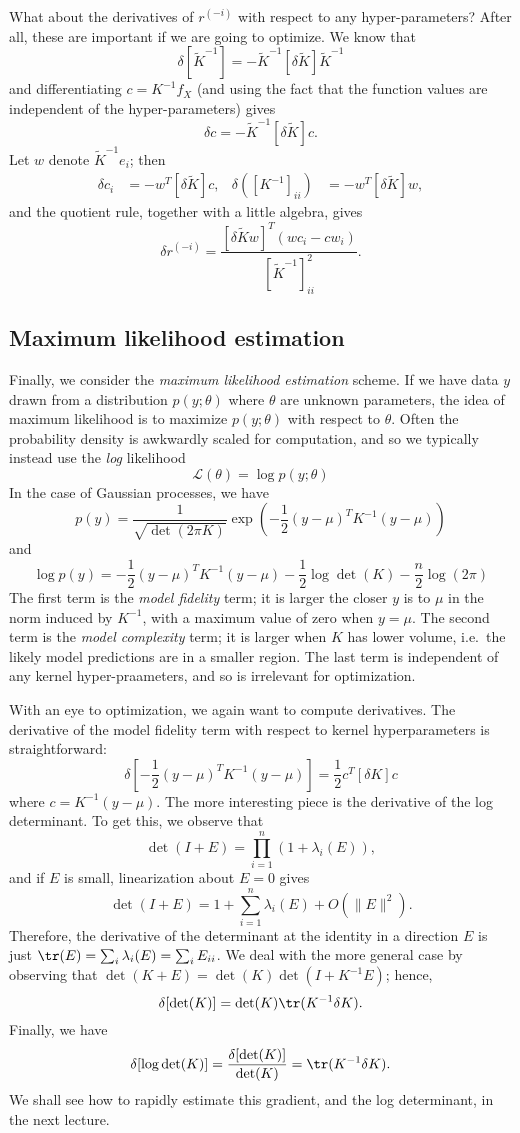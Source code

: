 \documentclass[12pt, leqno]{article} %
\begin{document}
What about the derivatives of $r^{(-i)}$ with respect to any
hyper-parameters?  After all, these are important if we are going to
optimize.  We know that
\[
  \delta[\tilde{K}^{-1}] = -\tilde{K}^{-1} [\delta \tilde{K}] \tilde{K}^{-1}
\]
and differentiating $c = K^{-1} f_X$ (and using the fact that the
function values are independent of the hyper-parameters) gives
\[
  \delta c = -\tilde{K}^{-1} [\delta \tilde{K}] c.
\]
Let $w$ denote $\tilde{K}^{-1} e_i$; then
\begin{align*}
  \delta c_i &= -w^T [\delta \tilde{K}] c, &
  \delta\left( [K^{-1}]_{ii} \right) &= -w^T [\delta \tilde{K}] w,
\end{align*}
and the quotient rule, together with a little algebra, gives
\[
\delta r^{(-i)} = \frac{[\delta \tilde{K} w]^T (wc_i-cw_i)}
                      {[\tilde{K}^{-1}]_{ii}^2}.
\]

\subsection{Maximum likelihood estimation}

Finally, we consider the {\em maximum likelihood estimation} scheme.
If we have data $y$ drawn from a distribution
$p(y ; \theta)$ where $\theta$ are unknown parameters, the idea of
maximum likelihood is to maximize $p(y; \theta)$ with respect to $\theta$.
Often the probability density is awkwardly scaled for computation,
and so we typically instead use the {\em log} likelihood
\[
  \mathcal{L}(\theta) =  \log p(y; \theta)
\]
In the case of Gaussian processes, we have
\[
p(y) = \frac{1}{\sqrt{\det(2\pi K)}}
       \exp\left( -\frac{1}{2} (y-\mu)^T K^{-1} (y-\mu) \right)
\]
and
\[
\log p(y) = -\frac{1}{2} (y-\mu)^T K^{-1} (y-\mu)
            -\frac{1}{2} \log \det(K) - \frac{n}{2} \log(2\pi)
\]
The first term is the {\em model fidelity} term; it is larger the closer
$y$ is to $\mu$ in the norm induced by $K^{-1}$, with a maximum value
of zero when $y=\mu$.  The second term is the {\em model complexity}
term; it is larger when $K$ has lower volume, i.e.~the likely model
predictions are in a smaller region.  The last term is independent
of any kernel hyper-praameters, and so is irrelevant for optimization.

With an eye to optimization, we again want to compute derivatives.
The derivative of the model fidelity term with respect to kernel
hyperparameters is straightforward:
\[
  \delta\left[ -\frac{1}{2} (y-\mu)^T K^{-1} (y-\mu) \right] =
  \frac{1}{2} c^T [\delta K] c
\]
where $c = K^{-1}(y-\mu)$.  The more interesting piece is the
derivative of the log determinant.  To get this, we observe that
\[
  \det(I+E) = \prod_{i=1}^n (1+\lambda_i(E)),
\]
and if $E$ is small, linearization about $E = 0$ gives
\[
  \det(I+E) = 1 + \sum_{i=1}^n \lambda_i(E) + O(\|E\|^2).
\]
Therefore, the derivative of the determinant at the identity
in a direction $E$ is just $\tr(E) = \sum_i \lambda_i(E) = \sum_i E_{ii}$.
We deal with the more general case by observing that
$\det(K+E) = \det(K) \det(I+K^{-1} E)$; hence,
\[
  \delta [\det(K)] = \det(K) \tr(K^{-1} \delta K).
\]
Finally, we have
\[
  \delta[\log \det(K)] = \frac{\delta[\det(K)]}{\det(K)}
    = \tr(K^{-1} \delta K).
\]
We shall see how to rapidly estimate this gradient, and the log
determinant, in the next lecture.
\end{document}
